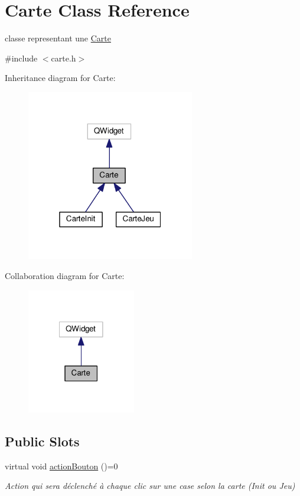 \hypertarget{classCarte}{\section{Carte Class Reference}
\label{classCarte}
}


classe representant une \hyperlink{classCarte}{Carte}  




{\ttfamily \#include $<$carte.\+h$>$}



Inheritance diagram for Carte\+:
\nopagebreak
\begin{figure}[H]
\begin{center}
\leavevmode
\includegraphics[width=208pt]{classCarte__inherit__graph}
\end{center}
\end{figure}


Collaboration diagram for Carte\+:
\nopagebreak
\begin{figure}[H]
\begin{center}
\leavevmode
\includegraphics[width=134pt]{classCarte__coll__graph}
\end{center}
\end{figure}
\subsection*{Public Slots}
\begin{DoxyCompactItemize}
\item 
virtual void \hyperlink{classCarte_a8628e3d1c1c812b945f2cc3987ae1a40}{action\+Bouton} ()=0
\begin{DoxyCompactList}\small\item\em Action qui sera déclenché à chaque clic sur une case selon la carte (Init ou Jeu) \end{DoxyCompactList}\end{DoxyCompactItemize}
